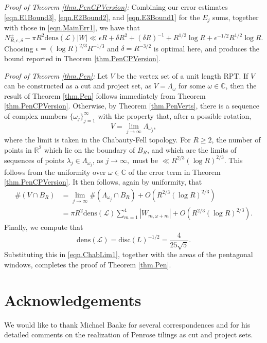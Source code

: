 \documentclass[reqno]{amsart}
\newcommand{\R}{\mathbb{R}}
\newcommand{\C}{\mathbb{C}}
\newcommand{\rar}{\rightarrow}
\newcommand{\mr}{\mathrm}
\newcommand{\cL}{\mathcal{L}}
\begin{document}
\noindent\emph{Proof of Theorem \ref{thm.PenCPVersion}:} Combining our error estimates \eqref{eqn.E1Bound3}, \eqref{eqn.E2Bound2}, and \eqref{eqn.E3Bound1} for the $E_j$ sums, together with those in \eqref{eqn.MainErr1}, we have that
\[N_{R,\epsilon,\delta}^\pm-\pi R^2\mr{dens}(\cL)|W|\ll \epsilon R+\delta R^2 + (\delta R)^{-1}+R^{1/2}\log R+\epsilon^{-1/2}R^{1/2}\log R.\]
Choosing $\epsilon=(\log R)^{2/3}R^{-1/3}$ and $\delta=R^{-3/2}$ is optimal here, and produces the bound reported in Theorem \ref{thm.PenCPVersion}.

\noindent\emph{Proof of Theorem \ref{thm.Pen}:} Let $V$ be the vertex set of a unit length RPT. If $V$ can be constructed as a cut and project set, as $V=\Lambda_\omega$ for some $\omega\in\C$, then the result of Theorem \ref{thm.Pen} follows immediately from Theorem \ref{thm.PenCPVersion}. Otherwise, by Theorem \ref{thm.PenVerts}, there is a sequence of complex numbers $\{\omega_j\}_{j=1}^\infty$ with the property that, after a possible rotation,
\[V=\lim_{j\rar\infty}\Lambda_{\omega_j},\]
where the limit is taken in the Chabauty-Fell topology. For $R\ge 2$, the number of points in $\R^2$ which lie on the boundary of $B_R$, and which are the limits of sequences of points $\lambda_j\in\Lambda_{\omega_j}$, as $j\rar\infty,$ must be $\ll R^{2/3}(\log R)^{2/3}$. This follows from the uniformity over $\omega\in \C$ of the error term in Theorem \ref{thm.PenCPVersion}. It then follows, again by uniformity, that
\begin{align}
	\#(V\cap B_R)&=\lim_{j\rar\infty}\#\left(\Lambda_{\omega_j}\cap B_R\right)+O(R^{2/3}(\log R)^{2/3})\nonumber\\
	&=\pi R^2\mr{dens}(\cL)\sum_{m=1}^4|W_{m,\omega+m}|+O( R^{2/3}(\log R)^{2/3}).\label{eqn.ChabLim1}
\end{align}
Finally, we compute that
\[\mr{dens}(\cL)=\mr{disc}(L)^{-1/2}=\frac{4}{25\sqrt{5}}.\]
Substituting this in \eqref{eqn.ChabLim1}, together with the areas of the pentagonal windows, completes the proof of Theorem \ref{thm.Pen}.

%
%

\section*{Acknowledgements}
We would like to thank Michael Baake for several correspondences and for his detailed comments on the realization of Penrose tilings as cut and project sets.
\end{document}
